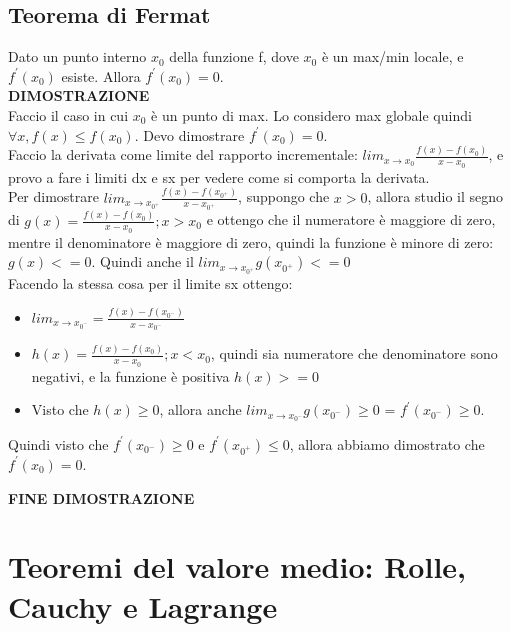 \documentclass[11pt]{article}
\begin{document}
\subsection{Teorema di Fermat}
Dato un punto interno $x_{0}$ della funzione f, dove $x_{0}$ è un max/min locale, e $f^{'}(x_{0})$ esiste. Allora $f^{'}(x_{0}) = 0$.\\
\textbf{DIMOSTRAZIONE}\\
Faccio il caso in cui $x_{0}$ è un punto di max. Lo considero max globale quindi $\forall x, f(x) \le f(x_{0})$. Devo dimostrare $f^{'}(x_{0}) = 0$.\\
Faccio la derivata come limite del rapporto incrementale: $lim_{x \rightarrow x_{0}}\frac{f(x)-f(x_{0})}{x-x_{0}}$, e provo a fare i limiti dx e sx per vedere come si comporta la derivata.\\
Per dimostrare $lim_{x \rightarrow x_{0^{+}}}\frac{f(x)-f(x_{0^{+}})}{x-x_{0^{+}}}$, suppongo che $x > 0$, allora studio il segno di $g(x) = \frac{f(x)-f(x_{0})}{x-x_{0}}; x > x_{0}$ e ottengo che il numeratore è 
maggiore di zero, mentre il denominatore è maggiore di zero, quindi la funzione è minore di zero: $g(x) <= 0$. Quindi anche il $lim_{x \rightarrow x_{0^{+}}} g(x_{0^{+}}) <= 0$\\
Facendo la stessa cosa per il limite sx ottengo:\\
\begin{itemize}
    \item $lim_{x \rightarrow x_{0^{-}}} = \frac{f(x) - f(x_{0^{-}})}{x - x_{0^{-}}}$
    \item $h(x) = \frac{f(x)-f(x_{0})}{x-x_{0}}; x < x_{0}$, quindi sia numeratore che denominatore sono negativi, e la funzione è positiva $h(x) >= 0$
    \item Visto che $h(x) \ge 0$, allora anche $lim_{x \rightarrow x_{0^{-}}}g(x_{0^{-}}) \ge 0$ = $f^{'}(x_{0^{-}}) \ge 0$.
\end{itemize}
Quindi visto che $f^{'}(x_{0^{-}}) \ge 0$ e $f^{'}(x_{0^{+}}) \le 0$, allora abbiamo dimostrato che $f^{'}(x_{0}) = 0$.
\begin{center}
    \textbf{FINE DIMOSTRAZIONE}
\end{center}
\section{Teoremi del valore medio: Rolle, Cauchy e Lagrange}
\end{document}
